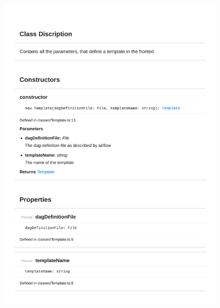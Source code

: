 \begin{figure}[H]
\centerline{\includegraphics[width=1\textwidth]{FrontendDocsAsPDF/Classes/Template.pdf}}
\end{figure}

